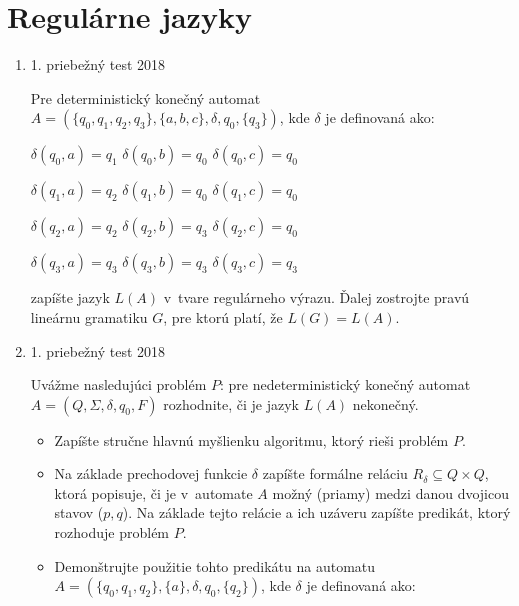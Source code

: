 \documentclass[]{article}
\begin{document}
	\section{Regulárne jazyky}
	\begin{enumerate}
		\item 1. priebežný test 2018
		
		Pre deterministický konečný automat $A = (\{q_0,q_1,q_2,q_3\}, \{a,b,c\}, \delta, q_0, \{q_3\})$, kde $\delta$ je definovaná ako:
		
		$\delta(q_0, a) = q_1$ \hspace{10pt} $\delta(q_0, b) = q_0$ \hspace{10pt} $\delta(q_0, c) = q_0$
		
		$\delta(q_1, a) = q_2$ \hspace{10pt} $\delta(q_1, b) = q_0$ \hspace{10pt} $\delta(q_1, c) = q_0$
		
		$\delta(q_2, a) = q_2$ \hspace{10pt} $\delta(q_2, b) = q_3$ \hspace{10pt} $\delta(q_2, c) = q_0$
		
		$\delta(q_3, a) = q_3$ \hspace{10pt} $\delta(q_3, b) = q_3$ \hspace{10pt} $\delta(q_3, c) = q_3$
		
		zapíšte jazyk $L(A)$ v~tvare regulárneho výrazu. Ďalej zostrojte pravú lineárnu gramatiku $G$, pre ktorú platí, že $L(G) = L(A)$.
		
		\item 1. priebežný test 2018
		
		Uvážme nasledujúci problém $P$: pre nedeterministický konečný automat $A = (Q, \Sigma, \delta, q_0, F)$ rozhodnite, či je jazyk $L(A)$ nekonečný.
		
		\begin{itemize}
			\item Zapíšte stručne hlavnú myšlienku algoritmu, ktorý rieši problém $P$.
			\item Na základe prechodovej funkcie $\delta$ zapíšte formálne reláciu $R_\delta \subseteq Q \times Q$, ktorá popisuje, či je v~automate $A$ možný (priamy) medzi danou dvojicou stavov ($p,q$). Na základe tejto relácie a ich uzáveru zapíšte predikát, ktorý rozhoduje problém $P$.
			\item Demonštrujte použitie tohto predikátu na automatu $A = (\{q_0,q_1,q_2\}, \{a\}, \delta, q_0, \{q_2\})$, kde $\delta$ je definovaná ako:
			

\end{itemize}
\end{enumerate}
\end{document}
